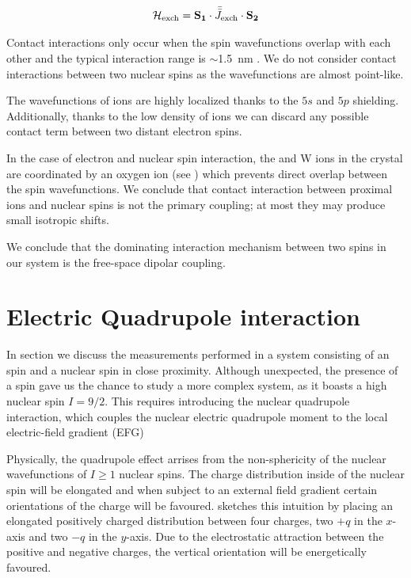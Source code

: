 \begin{equation}
    \mathcal{H}_{\text{exch}} = \mathbf{S_1} \cdot \bar{\bar {J}}_\text{exch} \cdot \mathbf{S_2}
\end{equation}

Contact interactions only occur when the spin wavefunctions overlap with each other and the typical interaction range is $\sim$1.5~nm . We do not consider contact interactions between two nuclear spins as the wavefunctions are almost point-like.

The wavefunctions of \Er ions are highly localized thanks to the $5s$ and $5p$ shielding. Additionally, thanks to the low density of \Er ions we can discard any possible contact term between two distant electron spins. 

In the case of electron and nuclear spin interaction, the \Er and W ions in the crystal are coordinated by an oxygen ion (see ) which prevents direct overlap between the spin wavefunctions. We conclude that contact interaction between proximal \Er ions and \W nuclear spins is not the primary coupling; at most they may produce small isotropic shifts.

We conclude that the dominating interaction mechanism between two spins in our system is the free-space dipolar coupling.

\section{Electric Quadrupole interaction}

In section  we discuss the measurements performed in a system consisting of an \Er spin and a \Nb nuclear spin in close proximity. Although unexpected, the presence of a \Nb spin gave us the chance to study a more complex system, as it boasts a high nuclear spin $I=9/2$. This requires introducing the nuclear quadrupole interaction, which couples the nuclear electric quadrupole moment to the local electric-field gradient (EFG)

Physically, the quadrupole effect arrises from the non-sphericity of the nuclear wavefunctions of $I\geq1$ nuclear spins. The charge distribution inside of the nuclear spin will be elongated and when subject to an external field gradient certain orientations of the charge will be favoured.  sketches this intuition by placing an elongated positively charged distribution between four charges, two $+q$ in the $x$-axis and two $-q$ in the $y$-axis. Due to the electrostatic attraction between the positive and negative charges, the vertical orientation will be energetically favoured.

